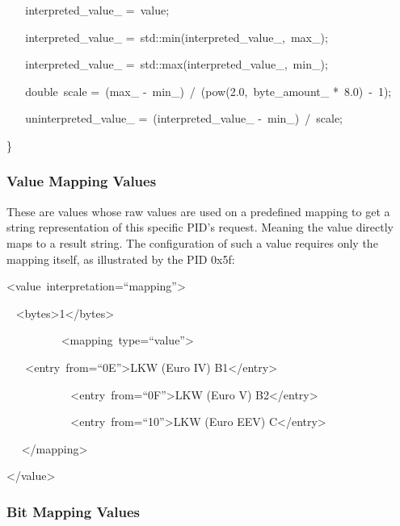 {~ ~ interpreted\_value\_ }{=}{~value;}

{~ ~ interpreted\_value\_
}{=}{~std}{::}{min}{(}{interpreted\_value\_}{,}{~max\_}{);}

{~ ~ interpreted\_value\_
}{=}{~std}{::}{max}{(}{interpreted\_value\_}{,}{~min\_}{);}

{~ ~ }{double}{~scale }{=}{~}{(}{max\_
}{-}{~min\_}{)}{~}{/}{~}{(}{pow}{(}{2.0}{,}{~byte\_amount\_
}{*}{~}{8.0}{)}{~}{-}{~}{1}{);}

{~ ~ uninterpreted\_value\_ }{=}{~}{(}{interpreted\_value\_
}{-}{~min\_}{)}{~}{/}{~scale;}

{\}}

\hypertarget{h.t1w3v8o28dma}{\subsubsection{\texorpdfstring{{Value
Mapping Values}}{Value Mapping Values}}\label{h.t1w3v8o28dma}}

{These are values whose raw values are used on a predefined mapping to
get a string representation of this specific PID's request. Meaning the
value directly maps to a result string. The configuration of such a
value requires only the mapping itself, as illustrated by the PID 0x5f:}

{\textless{}value}{~}{interpretation}{=}{``mapping''\textgreater{}}

{~ }{\textless{}bytes\textgreater{}}{1}{\textless{}/bytes\textgreater{}}

{~~~~~~~~~ }{\textless{}mapping}{~}{type}{=}{``value''\textgreater{}}

{~ ~ }{\textless{}entry}{~}{from}{=}{``0E''}{\textgreater{}}{LKW (Euro
IV) B1}{\textless{}/entry\textgreater{}}

{~~~~~~~~~ ~ }{\textless{}entry}{~}{from}{=}{``0F''}{\textgreater{}}{LKW
(Euro V) B2}{\textless{}/entry\textgreater{}}

{~~~~~~~~~ ~ }{\textless{}entry}{~}{from}{=}{``10''}{\textgreater{}}{LKW
(Euro EEV) C}{\textless{}/entry\textgreater{}}

{~ ~}{\textless{}/mapping\textgreater{}}{~~~~~~~~~~~~~~~~}

{\textless{}/value\textgreater{}}

\hypertarget{h.nvvniy6ibvmm}{\subsubsection{\texorpdfstring{{Bit Mapping
Values}}{Bit Mapping Values}}\label{h.nvvniy6ibvmm}}

